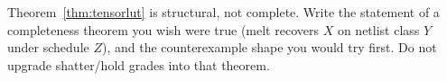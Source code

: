\begin{exercise}[Seminar]
Theorem~\ref{thm:tensorlut} is structural, not complete.
Write the statement of a completeness theorem you wish were true (melt
recovers $X$ on netlist class $Y$ under schedule $Z$), and the
counterexample shape you would try first.
Do not upgrade shatter/hold grades into that theorem.
\end{exercise}

